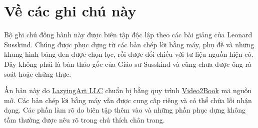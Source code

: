 \documentclass[11pt,oneside]{book}
\begin{document}
\frontmatter
\hypersetup{pageanchor=false}

\hypersetup{pageanchor=true}

\clearpage
\chapter*{Về các ghi chú này}
Bộ ghi chú đồng hành này được biên tập độc lập theo các bài giảng của Leonard Susskind. Chúng được phục dựng từ các bản chép lời bằng máy, phụ đề và những khung hình bảng đen được chọn lọc, rồi được đối chiếu với tư liệu nguồn hiện có. Đây không phải là bản thảo gốc của Giáo sư Susskind và cũng chưa được ông rà soát hoặc chứng thực.

Ấn bản này do \href{https://lazying.art}{LazyingArt LLC} chuẩn bị bằng quy trình \href{https://github.com/lachlanchen/Video2Book}{Video2Book} mã nguồn mở. Các bản chép lời bằng máy vẫn được cung cấp riêng và có thể chứa lỗi nhận dạng. Các phần làm rõ do biên tập thêm vào và những phần phục dựng không tầm thường được nêu rõ trong chú thích chân trang.
\clearpage
\tableofcontents
\mainmatter










\end{document}
